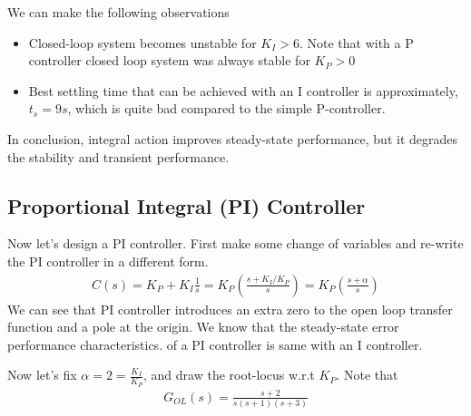 \documentclass[twoside]{article}
\begin{document}
We can make the following observations
%
\begin{itemize}
 \item Closed-loop system becomes unstable for $K_I > 6$. Note that
   with a P controller closed loop system was always stable for $K_P >0$
  \item Best settling time that can be achieved with an I controller
    is approximately, $t_{s} = 9 s$, which is quite bad compared to
   the simple P-controller. 
\end{itemize}
% 
In conclusion, integral action improves steady-state performance, but
it degrades the stability and transient performance. 

\subsection{Proportional Integral (PI) Controller}

Now let's design a PI controller. First make some change of
variables and re-write the PI controller in a different form.
%
\begin{align*}
 C(s) = K_P + K_I \frac{1}{s} = K_P \left( \frac{ s + K_I / K_P }{s}
  \right) = K_P \left( \frac{ s + \alpha }{s} \right)
\end{align*}
%
We can see that PI controller introduces an extra zero to the
open loop transfer function and a pole at the origin. 
We know that the steady-state error performance characteristics. 
of a PI controller is same with an I controller. 

Now let's fix $\alpha = 2 = \frac{K_I}{K_P}$, and draw 
the root-locus w.r.t $K_P$. Note that 
%
\begin{align*}
  G_{OL}(s) = \frac{s+2}{s (s+1) (s+3)}
\end{align*}
\end{document}
